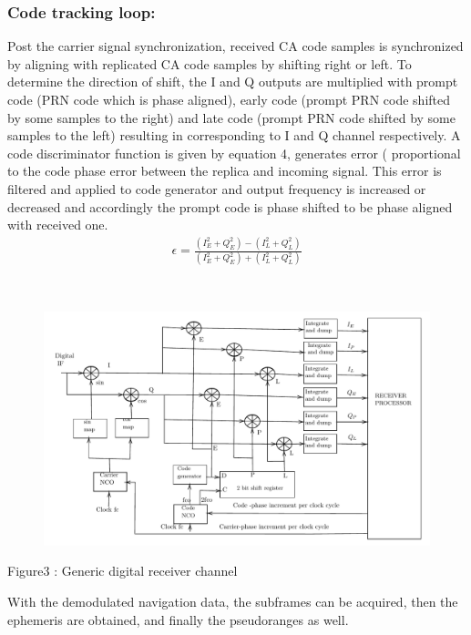 \documentclass[onecolumn]{article}
\begin{document}
\begin{enumerate}
\begin{Large}
\subsubsection{Code tracking loop:}Post the carrier signal synchronization, received CA code samples is synchronized by aligning with replicated CA code samples by shifting right or left. To determine the direction of shift, the I and Q outputs are multiplied with prompt code (PRN code which is phase aligned), early code (prompt PRN code shifted by some samples to the right) and late code (prompt PRN code shifted by some samples to the left) resulting in corresponding to I and Q channel respectively. A code discriminator function is given by equation 4, generates error ( proportional to the code
phase error between the replica and incoming signal. This error is filtered and applied to code generator and output frequency is increased or decreased and accordingly the prompt code is phase shifted to be phase aligned with received one.
\begin{align}
\epsilon=\frac{(I^2_E+Q^2_E)-(I^2_L+Q^2_L)}{(I^2_E+Q^2_E)+(I^2_L+Q^2_L)}
\end{align}
\end{Large}\\
\begin{normalsize}
\begin{figure}[!h]%
\centering%
\includegraphics{figures/block3}
\end{figure}
\end{normalsize}
\begin{Large}

\begin{center}
Figure3 : Generic digital receiver channel
\end{center}
With the demodulated navigation data, the subframes can be acquired, then the ephemeris are obtained, and finally the pseudoranges as well.



\end{Large}
\end{enumerate}
\end{document}
